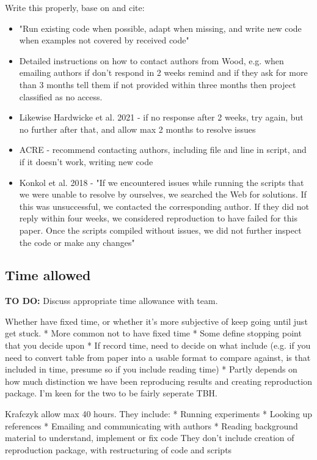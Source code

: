 Write this properly, base on and cite:
\begin{itemize}
    \item "Run existing code when possible, adapt when missing, and write new code when examples not covered by received code"\autocite{krafczyk_learning_2021}
    \item Detailed instructions on how to contact authors from Wood, e.g. when emailing authors if don't respond in 2 weeks remind and if they ask for more than 3 months tell them if not provided within three months then project classified as no access.\autocite{wood_push_2018,wood_replication_2018}
    \item Likewise Hardwicke et al. 2021 - if no response after 2 weeks, try again, but no further after that, and allow max 2 months to resolve issues
    \item ACRE - recommend contacting authors, including file and line in script, and if it doesn't work, writing new code\autocite{berkeley_initiative_for_transparency_in_the_social_sciences_guide_2022}
    \item Konkol et al. 2018 - "If we encountered issues while running the scripts that we were unable to resolve by ourselves, we searched the Web for solutions. If this was unsuccessful, we contacted the corresponding author. If they did not reply within four weeks, we considered reproduction to have failed for this paper. Once the scripts compiled without issues, we did not further inspect the code or make any changes" \autocite{konkol_computational_2019}
\end{itemize}

\subsection{Time allowed}

\textbf{TO DO:} Discuss appropriate time allowance with team.

Whether have fixed time, or whether it's more subjective of keep going until just get stuck.
* More common not to have fixed time
* Some define stopping point that you decide upon
* If record time, need to decide on what include (e.g. if you need to convert table from paper into a usable format to compare against, is that included in time, presume so if you include reading time)
* Partly depends on how much distinction we have been reproducing results and creating reproduction package. I'm keen for the two to be fairly seperate TBH.

Krafczyk allow max 40 hours. They include:
* Running experiments
* Looking up references
* Emailing and communicating with authors
* Reading background material to understand, implement or fix code
They don't include creation of reproduction package, with restructuring of code and scripts\autocite{krafczyk_learning_2021}

